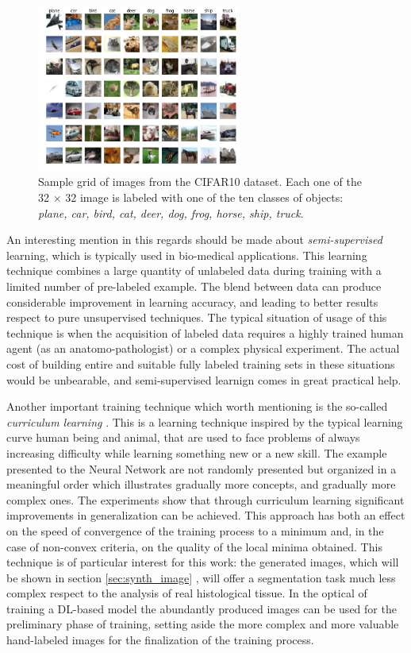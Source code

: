 \begin{figure}
    \centering
    \includegraphics[width = 0.6\textwidth]{images/cifar10}
    \caption{Sample grid of images from the CIFAR10 dataset. Each one of the 32 $\times$ 32 image is labeled with one of the ten classes of objects: \textit{plane, car, bird, cat, deer, dog, frog, horse, ship, truck}.}
    \label{fig:cf10}
\end{figure}

An interesting mention in this regards should be made about \textit{semi-supervised} learning, which is typically used in bio-medical applications. This learning technique combines a large quantity of unlabeled data during training with a limited number of pre-labeled example. The blend between data can produce considerable improvement in learning accuracy, and leading to better results respect to pure unsupervised techniques. The typical situation of usage of this technique is when the acquisition of labeled data requires a highly trained human agent (as an anatomo-pathologist) or a complex physical experiment. The actual cost of building entire and suitable fully labeled training sets in these situations would be unbearable, and semi-supervised learnign comes in great practical help.

Another important training technique which worth mentioning is the so-called \textit{curriculum learning} \cite{10.1145/1553374.1553380}. This is a learning technique inspired by the typical learning curve human being and animal, that are used to face problems of always increasing difficulty while learning something new or a new skill. The example presented to the Neural Network are not randomly presented but organized in a meaningful order which illustrates gradually more concepts, and gradually more complex ones. The experiments show that through curriculum learning significant improvements in generalization can be achieved. This approach has both an effect on the speed of convergence of the training process to a minimum and, in the case of non-convex criteria, on the quality of the local minima obtained. This technique is of particular interest for this work: the generated images, which will be shown in section \ref{sec:synth_image} , will offer a segmentation task much less complex respect to the analysis of real histological tissue. In the optical of training a DL-based model the abundantly produced images can be used for the preliminary phase of training, setting aside the more complex and more valuable hand-labeled images for the finalization of the training process.


